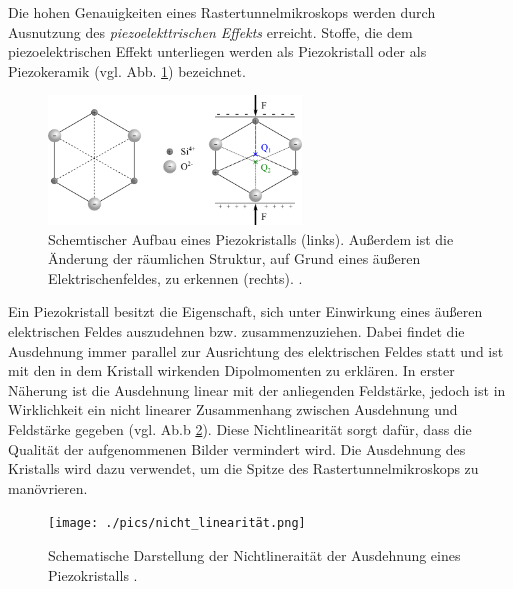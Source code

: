 Die hohen Genauigkeiten eines Rastertunnelmikroskops werden durch Ausnutzung des
\emph{piezoelekttrischen Effekts} erreicht. %
Stoffe, die dem piezoelektrischen Effekt unterliegen werden als Piezokristall %
oder als Piezokeramik (vgl. Abb. \ref{fig: piezo}) bezeichnet.
\begin{figure}[!h]
  \centering
  \includegraphics[width=0.6\textwidth]{./pics/piezo.png}
  \caption{Schemtischer Aufbau eines Piezokristalls (links). Außerdem ist die Änderung der räumlichen Struktur, auf Grund eines
  äußeren Elektrischenfeldes, zu erkennen (rechts). \cite{piezo}.}
  \label{fig: piezo}
\end{figure}
Ein Piezokristall besitzt die Eigenschaft, sich unter Einwirkung eines äußeren
elektrischen Feldes auszudehnen bzw. zusammenzuziehen.
Dabei findet die Ausdehnung immer parallel zur
Ausrichtung des elektrischen Feldes statt und ist mit den in dem Kristall wirkenden
Dipolmomenten zu erklären. In erster Näherung ist die Ausdehnung linear mit der anliegenden Feldstärke,
jedoch ist in Wirklichkeit ein nicht linearer Zusammenhang zwischen Ausdehnung und Feldstärke
gegeben (vgl. Ab.b \ref{fig: non_linear}). Diese Nichtlinearität sorgt dafür, dass die Qualität der aufgenommenen Bilder
vermindert wird. Die Ausdehnung des Kristalls wird dazu verwendet, um die Spitze des Rastertunnelmikroskops zu manövrieren.
\begin{figure}[!h]
  \centering
  \texttt{[image: ./pics/nicht\_linearität.png]}
  \caption{Schematische Darstellung der Nichtlineraität der Ausdehnung eines Piezokristalls \cite{rtm}.} %
  \label{fig: non_linear}
\end{figure}

